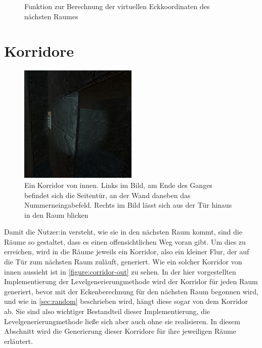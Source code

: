 \begin{figure}[H]%
    \centering
    \caption{Funktion zur Berechnung der virtuellen Eckkoordinaten des nächsten Raumes}
    \label{figure:calculateNewCornersScript}
\end{figure}

\section{Korridore}
\label{sec:corridor}


\begin{figure}[!h]
    \centering
    \includegraphics[width=0.5\textwidth]{vrscreenshots/korridorheraus.jpg}
    \caption{Ein Korridor von innen. Links im Bild, am Ende des Ganges befindet sich die Seitentür, an der Wand daneben das Nummerneingabefeld. Rechts im Bild lässt sich aus der Tür hinaus in den Raum blicken}\label{figure:corridor-out}
\end{figure}
Damit die Nutzer:in versteht, wie sie in den nächsten Raum kommt, sind die Räume so gestaltet, dass es einen offensichtlichen Weg voran gibt. Um dies zu erreichen, wird in die Räume jeweils ein Korridor, also ein kleiner Flur, der auf die Tür zum nächsten Raum zuläuft, generiert. Wie ein solcher Korridor von innen aussieht ist in \autoref{figure:corridor-out} zu sehen. In der hier vorgestellten Implementierung der Levelgenerierungmethode wird der Korridor für jeden Raum generiert, bevor mit der Eckenberechnung für den nächsten Raum begonnen wird, und wie in \autoref{sec:random} beschrieben wird, hängt diese sogar von dem Korridor ab. Sie sind also wichtiger Bestandteil dieser Implementierung, die Levelgenerierungmethode ließe sich aber auch ohne sie realisieren. In diesem Abschnitt wird die Generierung dieser Korridore für ihre jeweiligen Räume erläutert.


